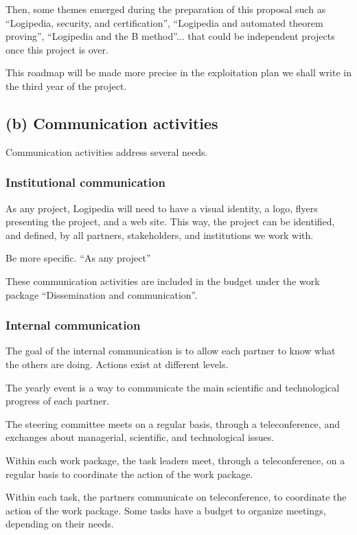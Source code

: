 Then, some themes emerged during the preparation of this proposal such
as ``Logipedia, security, and certification'', ``Logipedia and
automated theorem proving'', ``Logipedia and the B method''... that
could be independent projects once this project is over.

This roadmap will be made more precise in the exploitation plan
we shall write in the third year of the project.

\subsection*{(b) Communication activities}

Communication activities address several needs.

\subsubsection*{Institutional communication}

As any project, Logipedia will need to have a visual identity, a logo,
flyers presenting the project, and a web site.
This way, the project can be identified, and defined, by all partners,
stakeholders, and institutions we work with.

{\color{red} Be more specific. ``As any project''}

These communication activities are included in the budget under the
work package ``Dissemination and communication''.

\subsubsection*{Internal communication}

The goal of the internal communication is to allow each partner to
know what the others are doing. Actions exist at different levels.

\begin{compactitem}
\item The yearly event is a way to communicate the main scientific and
  technological progress of each partner.
\item The steering committee meets on a regular basis, through a
  teleconference, and exchanges about managerial, scientific, and
  technological issues.
\item Within each work package, the task leaders meet, through a
  teleconference, on a regular basis to coordinate the action of the
  work package.
\item Within each task, the partners communicate on teleconference, to
  coordinate the action of the work package. Some tasks have a budget
  to organize meetings, depending on their needs.
\end{compactitem}


